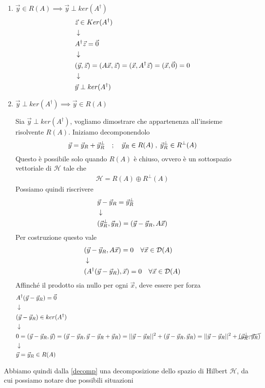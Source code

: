 \begin{enumerate}
	\item $ \vec{y} \in R(A)  \implies \vec{y} \perp ker(A^\dagger)$
	\begin{align}
		&\vec{z} \in Ker(A^\dagger) \\ &\downarrow \nonumber \\
		&A^\dagger \vec{z} = \vec{0} \nonumber \\ &\downarrow \nonumber \\
		&(\vec{y}, \vec{z}) = (A\vec{x}, \vec{z}) = (\vec{x}, A^\dagger\vec{z}) = (\vec{x}, \vec{0}) = 0 \\ &\downarrow \nonumber \\
		&\vec{y} \perp ker(A^\dagger)
	\end{align}
	
	\item $\vec{y} \perp ker(A^\dagger) \implies \vec{y} \in R(A)$
	
	Sia $\vec{y} \perp ker(A^\dagger)$, vogliamo dimostrare che appartenenza all'insieme risolvente $R(A)$. Iniziamo decomponendolo
	\begin{align}
		\vec{y} = \vec{y}_R + \vec{y}_R^\perp \quad ; \quad \vec{y}_R \in R(A) \; , \; \vec{y}_R^\perp \in R^\perp (A)
	\end{align}
	Questo è possibile solo quando $R(A)$ è chiuso, ovvero è un sottospazio vettoriale di $\mathcal{H}$ tale che
	\begin{align}
		\mathcal{H} = R(A) \oplus R^\perp(A) \label{decomp}
	\end{align}	
	Possiamo quindi riscrivere
	\begin{align}
		&\vec{y} - \vec{y}_R = \vec{y}_R^\perp \\ &\downarrow \nonumber \\
		&(\vec{y}_R^\perp, \vec{y}_R) = (\vec{y} - \vec{y}_R, A \vec{x})
	\end{align}
	Per costruzione questo vale
	\begin{align}
		&(\vec{y} - \vec{y}_R, A \vec{x}) = 0 \quad \forall \vec{x} \in \mathcal{D}(A) \\ &\downarrow \nonumber \\
		&(A^\dagger(\vec{y} - \vec{y}_R),\vec{x}) = 0 \quad \forall \vec{x} \in \mathcal{D}(A)  
	\end{align}
	Affinché il prodotto sia nullo per ogni $\vec{x}$, deve essere per forza
	\begin{align}
		&A^\dagger(\vec{y} - \vec{y}_R) = \vec{0} \\ &\downarrow \nonumber \\
		&(\vec{y} - \vec{y}_R) \in ker(A^\dagger) \nonumber \\ &\downarrow \nonumber \\
		&0 = (\vec{y} - \vec{y}_R, \vec{y}) = (\vec{y} - \vec{y}_R, \vec{y}- \vec{y}_R + \vec{y}_R) = || \vec{y} - \vec{y}_R||^2 + (\vec{y} - \vec{y}_R, \vec{y}_R) =  || \vec{y} - \vec{y}_R||^2 + \cancel{(\vec{y}_R^\perp, \vec{y}_R)} \nonumber \\ &\downarrow \nonumber \\
		&\vec{y} = \vec{y}_R \in R(A) 
	\end{align}
\end{enumerate}
Abbiamo quindi dalla \ref{decomp} una decomposizione dello spazio di Hilbert $\mathcal{H}$, da cui possiamo notare due possibili situazioni
